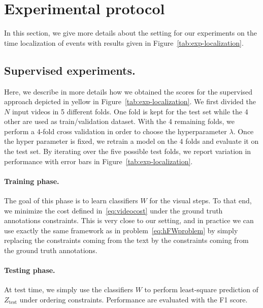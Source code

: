 \documentclass[10pt,twocolumn,letterpaper]{article}
\begin{document}
\section{Experimental protocol}
\label{subsec:details_experiments}

In this section, we give more details about the setting for our experiments on the time localization of events with results given in Figure~\ref{tab:exp-localization}.

\subsection{Supervised experiments.} 
Here, we describe in more details how we obtained the scores for the supervised approach depicted in yellow in Figure~\ref{tab:exp-localization}.
We first divided the $N$ input videos in 5 different folds.
One fold is kept for the test set while the 4 other are used as train/validation dataset.
With the 4 remaining folds, we perform a 4-fold cross validation in order to choose the hyperparameter $\lambda$.
Once the hyper parameter is fixed, we retrain a model on the 4 folds and evaluate it on the test set.
By iterating over the five possible test folds, we report variation in performance with error bars in Figure~\ref{tab:exp-localization}.

\paragraph{Training phase.}
The goal of this phase is to learn classifiers $W$ for the visual steps.
To that end, we minimize the cost defined in~\eqref{eq:videocost} under the ground truth annotations constraints.
This is very close to our setting, and in practice we can use exactly the same framework as in problem~\eqref{eq:hFWproblem} by simply replacing the constraints coming from the text by the constraints coming from the ground truth annotations.
\paragraph{Testing phase.}
At test time, we simply use the classifiers $W$ to perform least-square prediction of $Z_{\text{test}}$ under ordering constraints.
Performance are evaluated with the F1 score.

%
\end{document}
